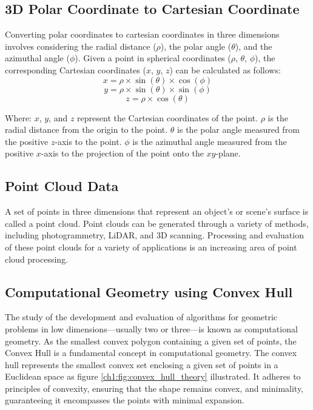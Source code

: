 \subsection{3D Polar Coordinate to Cartesian Coordinate}
Converting polar coordinates to cartesian coordinates in three dimensions involves considering the radial distance ($\rho$), the polar angle ($\theta$), and the azimuthal angle ($\phi$). Given a point in spherical coordinates ($\rho$, $\theta$, $\phi$), the corresponding Cartesian coordinates ($x$, $y$, $z$) can be calculated as follows:
\begin{equation}
	x = \rho \times \sin(\theta) \times \cos(\phi)
\end{equation}
\begin{equation}
	y = \rho \times \sin(\theta) \times \sin(\phi)
\end{equation}
\begin{equation}
	z = \rho \times \cos(\theta)
\end{equation}

Where:
$x$, $y$, and $z$ represent the Cartesian coordinates of the point.
$\rho$ is the radial distance from the origin to the point.
$\theta$ is the polar angle measured from the positive $z$-axis to the point.
$\phi$ is the azimuthal angle measured from the positive $x$-axis to the projection of the point onto the $xy$-plane.

\subsection{Point Cloud Data}
A set of points in three dimensions that represent an object's or scene's surface is called a point cloud. Point clouds can be generated through a variety of methods, including photogrammetry, LiDAR, and 3D scanning. Processing and evaluation of these point clouds for a variety of applications is an increasing area of point cloud processing.


\subsection{Computational Geometry using Convex Hull}
The study of the development and evaluation of algorithms for geometric problems in low dimensions—usually two or three—is known as computational geometry. As the smallest convex polygon containing a given set of points, the Convex Hull is a fundamental concept in computational geometry. The convex hull represents the smallest convex set enclosing a given set of points in a Euclidean space as figure \ref{ch1:fig:convex_hull_theory} illustrated. It adheres to principles of convexity, ensuring that the shape remains convex, and minimality, guaranteeing it encompasses the points with minimal expansion.

